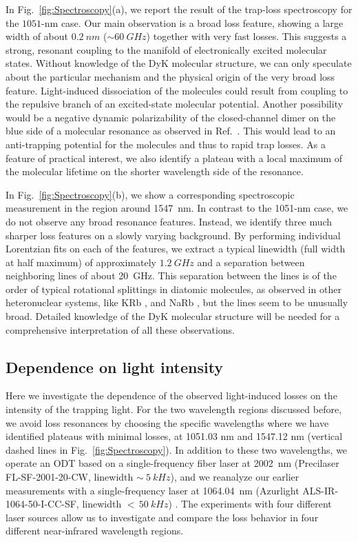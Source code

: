 In Fig.~\ref{fig:Spectroscopy}(a), we report the result of the trap-loss spectroscopy for the $1051$-nm case. Our main observation is a broad loss feature, showing a large width of  about $\SI{0.2}{nm}$ ($\sim\SI{60}{GHz}$) together with very fast losses. This suggests a strong, resonant coupling to the manifold of electronically excited molecular states. 
{Without knowledge of the DyK molecular structure, we can only speculate about the particular mechanism and the physical origin of the very broad loss feature. Light-induced dissociation of the molecules \cite{Jones2006ups} could result from coupling to the repulsive branch of an excited-state molecular potential. Another possibility would be a negative dynamic polarizability of the closed-channel dimer on the blue side of a molecular resonance as observed in Ref.~\cite{Melbourne}. This would lead to an anti-trapping potential for the molecules and thus to rapid trap losses.
	As a feature of practical interest, we also identify a plateau with a local maximum of the molecular lifetime on the shorter wavelength side of the resonance.} 

In Fig.~\ref{fig:Spectroscopy}(b), we show a corresponding spectroscopic measurement in the region around \SI{1547}{nm}. In contrast to the 1051-nm case, we do not observe any broad resonance features. Instead, we identify three much sharper loss features on a slowly varying background. By performing individual Lorentzian fits on each of the features, we extract a typical linewidth (full width at half maximum) of approximately $\SI{1.2}{GHz}$ and a separation between neighboring lines of about \SI{20}{GHz}. This separation between the lines is of the order of typical rotational splittings in diatomic molecules, as observed in other heteronuclear systems, like KRb \cite{Kasahara1999dfo}, and NaRb \cite{Guo2016coa,Guo2017hrm}, {but the lines seem to be unusually broad. Detailed knowledge of the DyK molecular structure will be needed for a comprehensive interpretation of all these observations.}

\subsection{Dependence on light intensity}
\label{subSec:LightIntensity}

Here we investigate the dependence of the observed light-induced losses on the intensity of the trapping light. For the two wavelength regions discussed before, we avoid loss resonances by choosing the specific wavelengths where we have identified plateaus with minimal losses, at 1051.03 nm and 1547.12 nm (vertical dashed lines in Fig.~\ref{fig:Spectroscopy}). In addition to these two wavelengths, we operate an ODT based on a single-frequency fiber laser at \SI{2002}{nm} (Precilaser FL-SF-2001-20-CW, linewidth $\sim~\SI{5}{kHz}$), and we reanalyze our earlier measurements with a single-frequency laser at \SI{1064.04}{nm} (Azurlight ALS-IR-1064-50-I-CC-SF, linewidth $<\,\SI{50}{kHz}$) \cite{Soave2023otf}. The experiments with four different laser sources allow us to investigate and compare the loss behavior in four different near-infrared wavelength regions.

